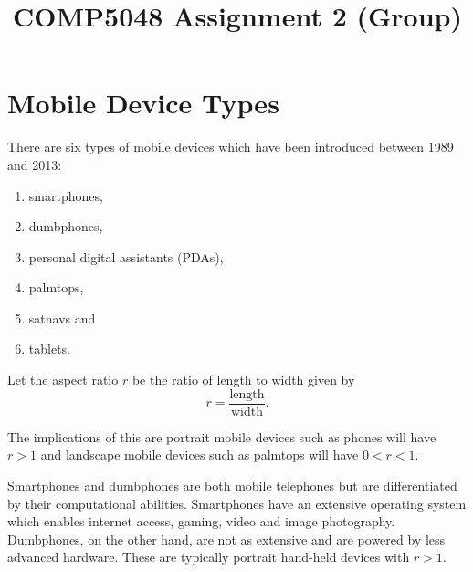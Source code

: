 \documentclass[conference]{IEEEtran}
\begin{document}
\title{COMP5048 Assignment 2 (Group)}

\author{
\and
{}
\and
{}
\and
{}
\and
{}
}

\maketitle



\section{Mobile Device Types}
\label{sec:A}

There are six types of mobile devices which have been introduced between 1989
and 2013:
\begin{enumerate}
	\item smartphones,
	\item dumbphones,
	\item personal digital assistants (PDAs),
	\item palmtops,
	\item satnavs and
	\item tablets.
\end{enumerate}

Let the aspect ratio $r$ be the ratio of length to width given by
\[ r = \frac{\text{length}}{\text{width}}. \]

The implications of this are portrait mobile devices such as phones will
have $r>1$ and landscape mobile devices such as palmtops will have $0<r<1$.

Smartphones and dumbphones are both mobile telephones but are differentiated by
their computational abilities. Smartphones have an extensive operating system
which enables internet access, gaming, video and image photography. Dumbphones,
on the other hand, are not as extensive and are powered by less advanced
hardware. These are typically portrait hand-held devices with $r>1$.
\end{document}
